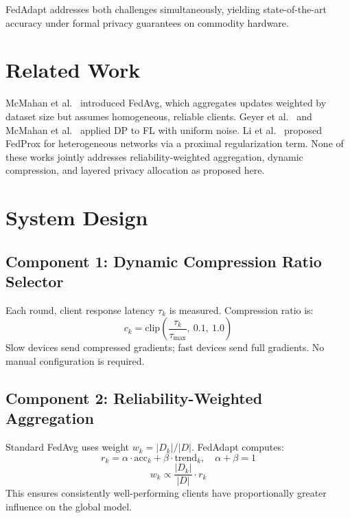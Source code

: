 \documentclass[10pt,twocolumn]{article}
\begin{document}
FedAdapt addresses both challenges simultaneously, yielding
state-of-the-art accuracy under formal privacy guarantees on
commodity hardware.

\section{Related Work}

McMahan et al.~\cite{mcmahan2017} introduced FedAvg, which aggregates
updates weighted by dataset size but assumes homogeneous, reliable
clients. Geyer et al.~\cite{geyer2017} and McMahan et
al.~\cite{mcmahan2018} applied DP to FL with uniform noise. Li et
al.~\cite{fedprox2020} proposed FedProx for heterogeneous networks
via a proximal regularization term. None of these works jointly
addresses reliability-weighted aggregation, dynamic compression, and
layered privacy allocation as proposed here.

\section{System Design}

\subsection{Component 1: Dynamic Compression Ratio Selector}
Each round, client response latency $\tau_k$ is measured.
Compression ratio is:
\begin{equation}
    c_k = \text{clip}\!\left(\frac{\tau_k}{\tau_{\max}},\ 0.1,\ 1.0\right)
\end{equation}
Slow devices send compressed gradients; fast devices send full
gradients. No manual configuration is required.

\subsection{Component 2: Reliability-Weighted Aggregation}
Standard FedAvg uses weight $w_k = |D_k|/|D|$. FedAdapt computes:
\begin{equation}
    r_k = \alpha \cdot \text{acc}_k + \beta \cdot \text{trend}_k,
    \quad \alpha + \beta = 1
\end{equation}
\begin{equation}
    w_k \propto \frac{|D_k|}{|D|} \cdot r_k
\end{equation}
This ensures consistently well-performing clients have proportionally
greater influence on the global model.
\end{document}
